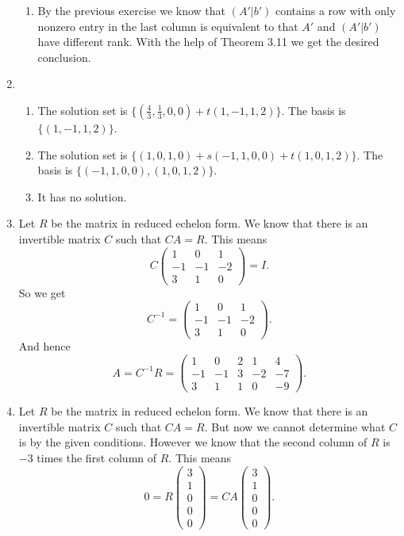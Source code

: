 \begin{enumerate}
\begin{enumerate}
\item By the previous exercise we know that $(A'|b')$ contains a row with only nonzero entry in the last column is equivalent to that $A'$ and $(A'|b')$ have different rank. With the help of Theorem 3.11 we get the desired conclusion.
\end{enumerate}
\item \begin{enumerate}
\item The solution set is $\{(\frac{4}{3},\frac{1}{3},0,0)+t(1,-1,1,2)\}$. The basis is $\{(1,-1,1,2)\}$.
\item The solution set is $\{(1,0,1,0)+s(-1,1,0,0)+t(1,0,1,2)\}$. The basis is $\{(-1,1,0,0),(1,0,1,2)\}$.
\item It has no solution.
\end{enumerate}
\item Let $R$ be the matrix in reduced echelon form. We know that there is an invertible matrix $C$ such that $CA=R$. This means 
\[C\begin{pmatrix}1&0&1\\-1&-1&-2\\3&1&0\end{pmatrix}=I.\]
So we get 
\[C^{-1}=\begin{pmatrix}1&0&1\\-1&-1&-2\\3&1&0\end{pmatrix}.\]
And hence 
\[A=C^{-1}R=\begin{pmatrix}1&0&2&1&4\\-1&-1&3&-2&-7\\3&1&1&0&-9\end{pmatrix}.\]
\item Let $R$ be the matrix in reduced echelon form. We know that there is an invertible matrix $C$ such that $CA=R$. But now we cannot determine what $C$ is by the given conditions. However we know that the second column of $R$ is $-3$ times the first column of $R$. This means 
\[0=R\begin{pmatrix}3\\1\\0\\0\\0\end{pmatrix}=CA\begin{pmatrix}3\\1\\0\\0\\0\end{pmatrix}.\]

\end{enumerate}
